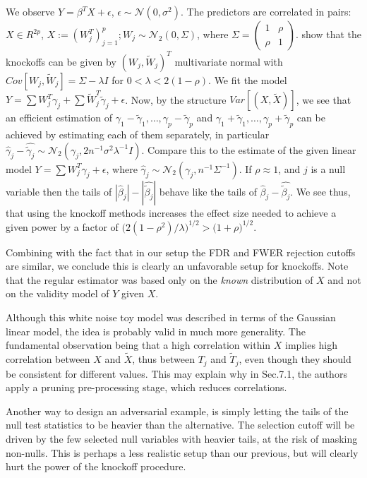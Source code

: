 \documentclass[article,lineno]{biometrika}
\begin{document}
	We observe $Y=\beta^T X+\epsilon$, $\epsilon\sim \mathcal{N}(0,\sigma^2)$.
	The predictors are correlated in pairs: 
	$X\in R^{2p}$, 
	$X:=(W_j^T)_{j=1}^p; W_j\sim \mathcal{N}_2(0,\Sigma)$, where $\Sigma=\begin{pmatrix}1 & \rho\\\rho &1\end{pmatrix}$.
	\citet{CandesPanninggoldmodelX2018} show that the knockoffs can be given by $(W_j,\tilde W_j)^T$ multivariate normal with $Cov[W_j,\tilde W_j]=\Sigma-\lambda I$ for  $0<\lambda<2(1-\rho)$. 
	We fit the model $Y=\sum W_j^T \gamma_j+\sum \tilde W_j^T \tilde\gamma_j+\epsilon$. 
	Now, by the structure $Var[(X,\tilde X)]$, we see that an efficient estimation of $\gamma_1-\tilde \gamma_1,\dots,\gamma_p-\tilde \gamma_p$ and $\gamma_1+\tilde\gamma_1,\dots,\gamma_p+\tilde\gamma_p$ can be achieved by estimating each of them separately, in particular $\hat\gamma_j -\widehat{\tilde\gamma_j}\sim \mathcal{N}_2(\gamma_j, 2n^{-1}\sigma^2\lambda^{-1} I)$. 
	Compare this to the estimate of the given linear model $Y=\sum W_j^T \gamma_j+\epsilon$, where $\hat\gamma_j\sim\mathcal{N}_2(\gamma_j,n^{-1}\Sigma^{-1})$. 
	If $\rho\approx1$, and $j$ is a null variable then the tails of $|\hat \beta_j|-|\widehat{\tilde\beta_j}|$ behave like the tails of $\hat\beta_j-\widehat{\tilde\beta_j}$. We see thus, that using the knockoff methods increases the effect size needed to achieve a given power by a factor of $\bigl(2(1-\rho^2)/\lambda\bigr)^{1/2}>\bigl(1+\rho\bigr)^{1/2}$.
	
	Combining with the fact that in our setup the FDR and FWER rejection cutoffs are similar, we conclude this is clearly an unfavorable setup for knockoffs. Note that the regular estimator was based only on the \emph{known} distribution of  $X$ and not on the validity model of $Y$ given $X$.
	
	Although this white noise toy model was described in terms of the Gaussian linear model, the idea is probably valid in much more generality. 
	The fundamental observation being that a high correlation within $X$ implies high correlation between $X$ and $\tilde X$, thus between $T_j$ and $\tilde T_j$, even though they should be consistent for different values.
	This may explain why in Sec.7.1, \citet[Sec.7.1]{SesiaGenehuntinghidden} the authors apply a pruning pre-processing stage, which reduces correlations.
	
	
	Another way to design an adversarial example, is simply letting the tails of the null test statistics to be heavier than the alternative.
	The selection cutoff will be driven by the few selected null variables with heavier tails, at the risk of masking non-nulls.
	This is perhaps a less realistic setup than our previous, but will clearly hurt the power of the knockoff procedure.
	
\end{document}
